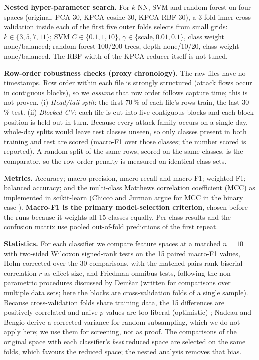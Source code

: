\documentclass{ieeeaccess}
\begin{document}
\textbf{Nested hyper-parameter search.} For $k$-NN, SVM and random forest on four spaces (original, PCA-30, KPCA-cosine-30, KPCA-RBF-30), a 3-fold inner cross-validation inside each of the first five outer folds selects from small grids: $k\in\{3,5,7,11\}$; SVM $C\in\{0.1,1,10\}$, $\gamma\in\{\text{scale},0.01,0.1\}$, class weight none/balanced; random forest 100/200 trees, depth none/10/20, class weight none/balanced. The RBF width of the KPCA reducer itself is not tuned.

\textbf{Row-order robustness checks (proxy chronology).} The raw files have no timestamps. Row order within each file is strongly structured (attack flows occur in contiguous blocks), so we \emph{assume} that row order follows capture time; this is not proven. (i) \emph{Head/tail split}: the first 70\,\% of each file's rows train, the last 30\,\% test. (ii) \emph{Blocked CV}: each file is cut into five contiguous blocks and each block position is held out in turn. Because every attack family occurs on a single day, whole-day splits would leave test classes unseen, so only classes present in both training and test are scored (macro-F1 over those classes; the number scored is reported). A random split of the same rows, scored on the same classes, is the comparator, so the row-order penalty is measured on identical class sets.

\textbf{Metrics.} Accuracy; macro-precision, macro-recall and macro-F1; weighted-F1; balanced accuracy; and the multi-class Matthews correlation coefficient (MCC) as implemented in scikit-learn (Chicco and Jurman argue for MCC in the binary case \cite{chicco2020}). \textbf{Macro-F1 is the primary model-selection criterion}, chosen before the runs because it weights all 15 classes equally. Per-class results and the confusion matrix use pooled out-of-fold predictions of the first repeat.

\textbf{Statistics.} For each classifier we compare feature spaces at a matched $n=10$ with two-sided Wilcoxon signed-rank tests on the 15 paired macro-F1 values, Holm-corrected over the 30 comparisons, with the matched-pairs rank-biserial correlation $r$ as effect size, and Friedman omnibus tests, following the non-parametric procedures discussed by Dem\v{s}ar \cite{demsar2006} (written for comparisons over multiple data sets; here the blocks are cross-validation folds of a single sample). Because cross-validation folds share training data, the 15 differences are positively correlated and naive $p$-values are too liberal (optimistic) \cite{nadeau2003}; Nadeau and Bengio derive a corrected variance for random subsampling, which we do not apply here; we use them for screening, not as proof. The comparisons of the original space with each classifier's \emph{best} reduced space are selected on the same folds, which favours the reduced space; the nested analysis removes that bias.
\end{document}
